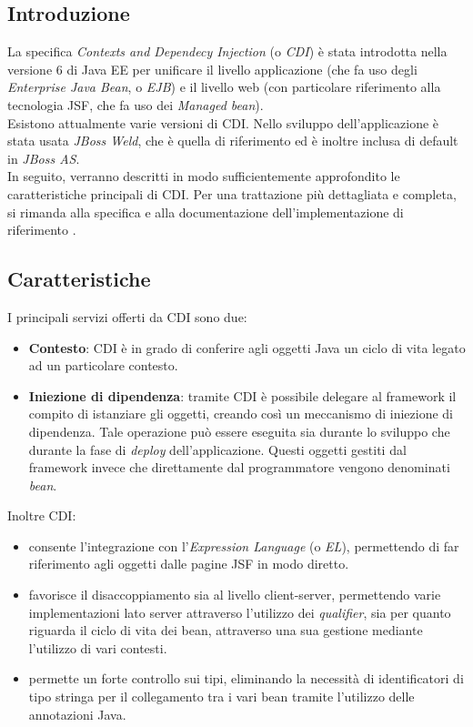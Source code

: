 \subsection{Introduzione}

La specifica \textsl{Contexts and Dependecy Injection} (o \textsl{CDI}) è stata introdotta nella versione 6 di Java EE per unificare il livello applicazione (che fa uso degli \textsl{Enterprise Java Bean}, o \textsl{EJB}) e il livello web (con particolare riferimento alla tecnologia JSF, che fa uso dei \textsl{Managed bean}).\\
Esistono attualmente varie versioni di CDI. Nello sviluppo dell'applicazione è stata usata \textsl{JBoss Weld}, che è quella di riferimento ed è inoltre inclusa di default in \textsl{JBoss AS}.\\
In seguito, verranno descritti in modo sufficientemente approfondito le caratteristiche principali di CDI. Per una trattazione più dettagliata e completa, si rimanda alla specifica \cite{cdi} e alla documentazione dell'implementazione di riferimento \cite{weld}.

\subsection{Caratteristiche}

I principali servizi offerti da CDI sono due:

\begin{itemize}
\item \textbf{Contesto}: CDI è in grado di conferire agli oggetti Java un ciclo di vita legato ad un particolare contesto.
\item \textbf{Iniezione di dipendenza}: tramite CDI è possibile delegare al framework il compito di istanziare gli oggetti, creando così un meccanismo di iniezione di dipendenza. Tale operazione può essere eseguita sia durante lo sviluppo che durante la fase di \textit{deploy} dell'applicazione. Questi oggetti gestiti dal framework invece che direttamente dal programmatore vengono denominati \textsl{bean}.
\end{itemize}

Inoltre CDI:

\begin{itemize}
\item consente l'integrazione con l'\textsl{Expression Language} (o \textsl{EL}), permettendo di far riferimento agli oggetti dalle pagine JSF in modo diretto.
\item favorisce il disaccoppiamento sia al livello client-server, permettendo varie implementazioni lato server attraverso l'utilizzo dei \textit{qualifier}, sia per quanto riguarda il ciclo di vita dei bean, attraverso una sua gestione mediante l'utilizzo di vari contesti.
\item permette un forte controllo sui tipi, eliminando la necessità di identificatori di tipo stringa per il collegamento tra i vari bean tramite l'utilizzo delle annotazioni Java.
\end{itemize}

